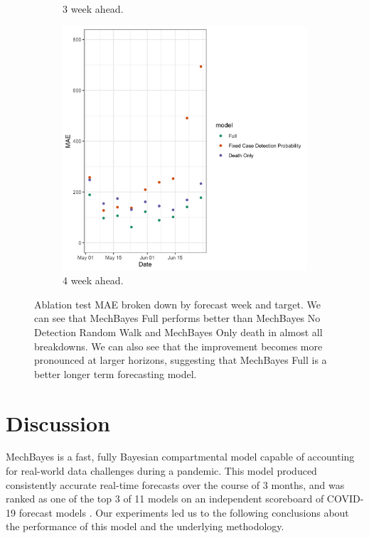 \documentclass[11pt]{amsart}
\begin{document}
\begin{figure}
\begin{subfigure}{.5\textwidth}
    \caption{3 week ahead.}
\end{subfigure}%
\begin{subfigure}{.5\textwidth}
  \centering
    \includegraphics[scale=.15]{ablation_4.png}
    \caption{4 week ahead. }
\end{subfigure}

\caption{Ablation test MAE broken down by forecast week and target. We can see that MechBayes Full performs better than MechBayes No Detection Random Walk and MechBayes Only death in almost all breakdowns. We can also see that the improvement becomes more pronounced at larger horizons, suggesting that MechBayes Full is a better longer term forecasting model.  }
\label{fig:ablation}
\end{figure}




\section{Discussion}

MechBayes is a fast, fully Bayesian compartmental model capable of accounting for real-world data challenges during a pandemic.  This model produced consistently accurate real-time forecasts over the course of 3 months, and was ranked as one of the top 3 of 11 models on an independent scoreboard of COVID-19 forecast models \cite{yyg}. Our experiments led us to the following conclusions about the performance of this model and the underlying methodology.
\end{document}
